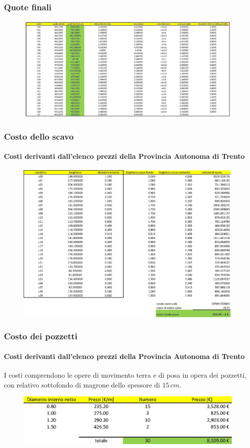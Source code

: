 \documentclass{beamer}
\newcommand{\nologo}{\setbeamertemplate{logo}{}}
\begin{document}
{\nologo
\begin{frame}
 \frametitle{Quote finali}
 \begin{figure}
  \centering
  \includegraphics[width=\textwidth]{images/quote_nodi}
 \end{figure}
\end{frame}
}
{\nologo
\begin{frame}
 \frametitle{Costo dello scavo}
 \framesubtitle{Costi derivanti dall'elenco prezzi della Provincia Autonoma di Trento}
 \begin{figure}
  \centering
  \includegraphics[height=.8\textheight]{images/costo_scavo}
 \end{figure}
\end{frame}
}

\begin{frame}
 \frametitle{Costo dei pozzetti}
 \framesubtitle{Costi derivanti dall'elenco prezzi della Provincia Autonoma di Trento}
 I costi comprendono le opere di movimento terra e di posa in opera dei pozzetti, con relativo sottofondo di magrone dello spessore di $15\,cm$.
 \begin{figure}
  \centering
  \includegraphics[width=\textwidth]{images/costo_pozzetti}
 \end{figure}
\end{frame}
\end{document}
